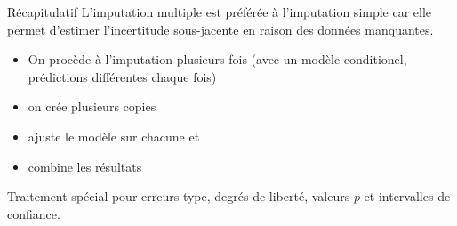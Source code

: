 \documentclass[
  ignorenonframetext,
]{beamer}
\providecommand{\tightlist}{%
  \setlength{\itemsep}{0pt}\setlength{\parskip}{0pt}}\usepackage{longtable,booktabs,array}
\begin{document}
\begin{frame}{Récapitulatif}
\protect\hypertarget{ruxe9capitulatif-1}{}
L'imputation multiple est préférée à l'imputation simple car elle permet
d'estimer l'incertitude sous-jacente en raison des données manquantes.

\begin{itemize}
\tightlist
\item
  On procède à l'imputation plusieurs fois (avec un modèle conditionel,
  prédictions différentes chaque fois)
\item
  on crée plusieurs copies
\item
  ajuste le modèle sur chacune et
\item
  combine les résultats
\end{itemize}

Traitement spécial pour erreurs-type, degrés de liberté, valeurs-\(p\)
et intervalles de confiance.
\end{frame}
\end{document}
